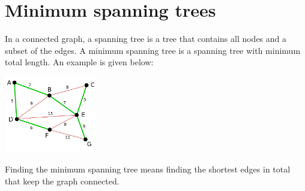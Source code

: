 \section{Minimum spanning trees}

In a connected graph, a spanning tree is a tree that contains all nodes
and a subset of the edges.
A minimum spanning tree is a spanning tree with minimum total length.
An example is given below:
\begin{center}
    \includegraphics[width=0.3\textwidth]{img/spanning}
\end{center}

Finding the minimum spanning tree means finding the shortest edges in total
that keep the graph connected.



